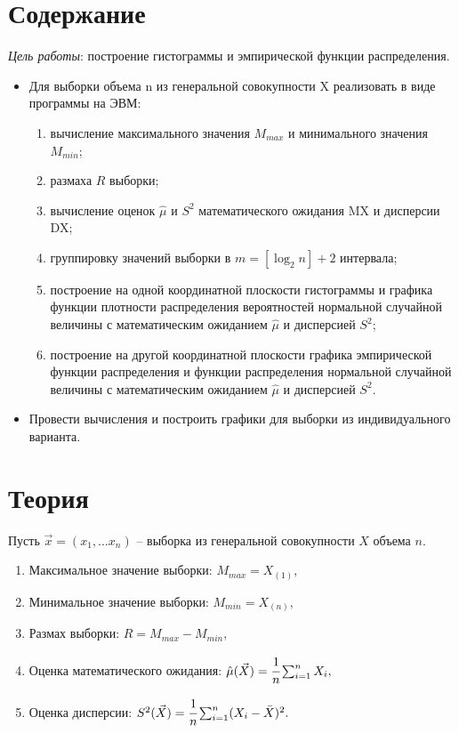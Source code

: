 
\chapter{Содержание}

\textit{Цель работы}: построение гистограммы и эмпирической функции распределения.
\begin{itemize}
	\item Для выборки объема n из генеральной совокупности X реализовать в виде программы на ЭВМ:
	\begin{enumerate}
		\item вычисление максимального значения $M_{max}$ и минимального значения $M_{min}$;
		\item размаха $R$ выборки;
		\item вычисление оценок $\hat{\mu}$ и $S^2$ математического ожидания MX и дисперсии DX;
		\item группировку значений выборки в $m = [\log_2n] + 2$ интервала;
		\item построение на одной координатной плоскости гистограммы и графика функции плотности распределения вероятностей нормальной случайной величины с математическим ожиданием $\hat{\mu}$ и дисперсией $S^2$;
		\item построение на другой координатной плоскости графика эмпирической функции распределения и функции распределения нормальной случайной величины с математическим ожиданием $\hat{\mu}$ и дисперсией $S^2$.
	\end{enumerate}
	\item Провести вычисления и построить графики для выборки из индивидуального варианта.
\end{itemize}


\chapter{Теория}
Пусть $\vec{x} = (x_1, \dots x_n)$ -- выборка из генеральной совокупности $X$ объема $n$.
\begin{enumerate}[wide=0pt]
	\item Максимальное значение выборки: $M_{max} = X_{(1)},$

	\item Минимальное значение выборки: $M_{min} = X_{(n)},$

	\item Размах выборки: $R = M_{max} - M_{min},$

	\item Оценка математического ожидания: $\hat{\mu}(\vec{X}) = \cfrac{1}{n}\sum_{i = 1}^{n}X_i,$

	\item Оценка дисперсии: $S^2(\vec{X}) = \cfrac{1}{n}\sum_{i = 1}^{n}(X_i - \bar{X})^2.$
\end{enumerate}


